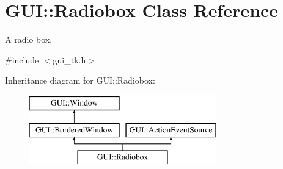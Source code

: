 \hypertarget{classGUI_1_1Radiobox}{\section{G\-U\-I\-:\-:Radiobox Class Reference}
\label{classGUI_1_1Radiobox}
}


A radio box.  




{\ttfamily \#include $<$gui\-\_\-tk.\-h$>$}

Inheritance diagram for G\-U\-I\-:\-:Radiobox\-:\begin{figure}[H]
\begin{center}
\leavevmode
\includegraphics[height=3.000000cm]{classGUI_1_1Radiobox}
\end{center}
\end{figure}
